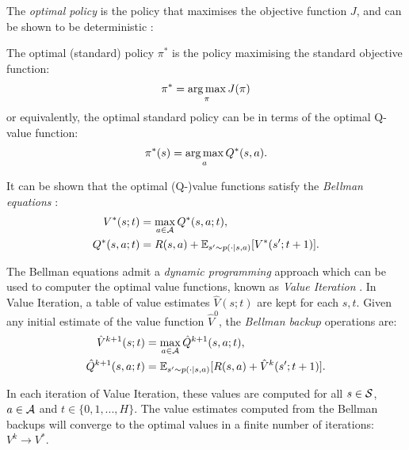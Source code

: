     The \textit{optimal policy} is the policy that maximises the objective function $J$, and can be shown to be deterministic \cite{kolobov}:
    \begin{defn}
        \label{def:2:opt_policy}
        The \textnormal{optimal (standard) policy} $\pi^*$ is the policy maximising the standard objective function:
        \begin{align}
            \pi^* = \operatorname*{arg\,max}_\pi J(\pi) \label{eq:2:opt_policy_def}
        \end{align}
        or equivalently, the optimal standard policy can be in terms of the optimal Q-value function:
        \begin{align}
            \pi^*(s) = \operatorname*{arg\,max}_a Q^*(s,a). \label{eq:2:opt_policy_from_opt_q_value}
        \end{align}
    \end{defn}

    It can be shown that the optimal (Q-)value functions satisfy the \textit{Bellman equations} \cite{dp,kolobov}:
    \begin{align}
        V^*(s;t) &= \max_{a\in\mathcal{A}} Q^*(s,a;t), \label{eq:2:bellman_opt_v} \\
        Q^*(s,a;t) &= R(s,a) + \mathbb{E}_{s'\sim p(\cdot|s,a)} [V^*(s';t+1)]. \label{eq:2:bellman_opt_q}
    \end{align} 

    The Bellman equations admit a \textit{dynamic programming} approach which can be used to computer the optimal value functions, known as \textit{Value Iteration} \cite{dp,kolobov}. In Value Iteration, a table of value estimates $\hat{V}(s;t)$ are kept for each $s,t$. Given any initial estimate of the value function $\hat{V}^{0}$, the \textit{Bellman backup} operations are:
    \begin{align}
        \hat{V}^{k+1}(s;t) &= \max_{a\in\mathcal{A}} \hat{Q}^{k+1}(s,a;t), \label{eq:2:value_iter_v_backup} \\
        \hat{Q}^{k+1}(s,a;t) &= \mathbb{E}_{s'\sim p(\cdot|s,a)} [R(s,a) + \hat{V}^k(s';t+1)]. \label{eq:2:value_iter_q_backup}
    \end{align}

    In each iteration of Value Iteration, these values are computed for all $s\in\mathcal{S}$, $a\in\mathcal{A}$ and $t\in\{0,1,...,H\}$. The value estimates computed from the Bellman backups will converge to the optimal values in a finite number of iterations: $V^{k}\rightarrow V^*$.









